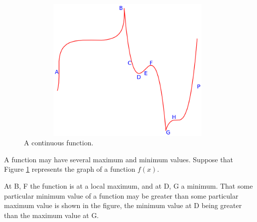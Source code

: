 \begin{figure}[h!]
\begin{minipage}{\textwidth}
\begin{center}
\includegraphics[height=7cm,width=11cm]{curve-tangent3.eps}
\end{center}
\end{minipage}
\caption{A continuous function.}
\label{fig:crazy-fcn}
\end{figure}

A function may have several maximum and minimum values. Suppose 
that Figure \ref{fig:crazy-fcn} represents the graph of a function $f(x)$.

At B, F the function is at a local maximum, and at D, G 
a minimum. That some particular minimum value of a function 
may be greater than some particular maximum value is 
shown in the figure, the minimum value at D being greater 
than the maximum value at G.

